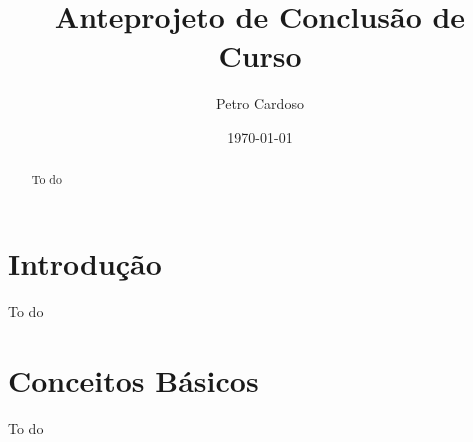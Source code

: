 \documentclass[12pt, a4paper]{article}
\begin{document}
\title{Anteprojeto de Conclusão de Curso}
\author{Petro Cardoso}
\date{\today}



\begin{abstract} 
    To do
\end{abstract}
\newpage

\listoffigures
\newpage

\listoftables
\newpage

\tableofcontents
\newpage

\section{Introdução}
To do

\section{Conceitos Básicos}
To do

\newpage


\newpage
\nocite{*}


\end{document}
